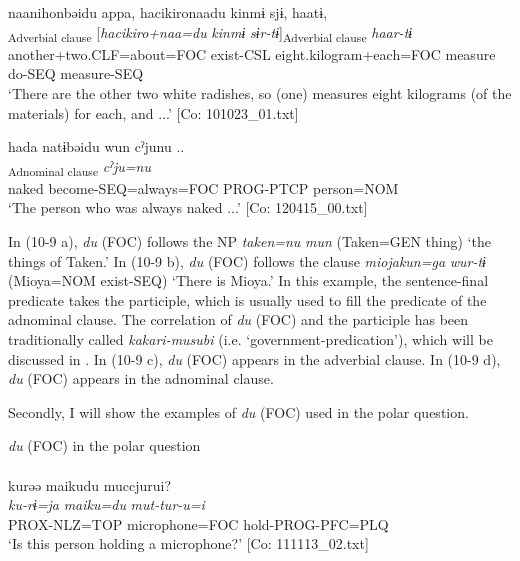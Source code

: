   \ex  %
      \glll    naa{\textbar}nihon{\textbar}bəidu  appa,  {\textbar}hacikiro{\textbar}naadu   kinmɨ  sjɨ,  haatɨ,\\
      [\textit{naa+nihon=bəi=du}  \textit{ar-ba}]\textsubscript{Adverbial clause}  [\textit{hacikiro+naa=du} \textit{kinmɨ}  \textit{sɨr-tɨ}]\textsubscript{Adverbial clause}  \textit{haar-tɨ}\\
      another+two.CLF=about=FOC  exist-CSL  eight.kilogram+each=FOC      measure  do-SEQ  measure-SEQ\\
      \glt       ‘There are the other two white radishes, so (one) measures eight kilograms (of the materials) for each, and ...’ [Co: 101023\_01.txt]

  \ex  %
      \glll    hada  natɨbəidu  wun  cˀjunu ..\\
      [\textit{hada}  \textit{nar-tɨ=bəi=du}  \textit{wur-n}]\textsubscript{Adnominal clause}  \textit{cˀju=nu}\\
      naked  become-SEQ=always=FOC  PROG-PTCP  person=NOM\\
      \glt       ‘The person who was always naked ...’ [Co: 120415\_00.txt]
    \z
\z

In (10-9 a), \textit{du} (FOC) follows the NP \textit{taken=nu} \textit{mun} (Taken=GEN thing) ‘the things of Taken.’ In (10-9 b), \textit{du} (FOC) follows the clause \textit{miojakun=ga} \textit{wur-tɨ} (Mioya=NOM exist-SEQ) ‘There is Mioya.’ In this example, the sentence-final predicate takes the participle, which is usually used to fill the predicate of the adnominal clause. The correlation of \textit{du} (FOC) and the participle has been traditionally called \textit{kakari-musubi} (i.e. ‘government-predication’), which will be discussed in . In (10-9 c), \textit{du} (FOC) appears in the adverbial clause. In (10-9 d), \textit{du} (FOC) appears in the adnominal clause.

  Secondly, I will show the examples of \textit{du} (FOC) used in the polar question.

\ea\label{ex:10.10}   \textit{du} (FOC) in the polar question\\
  \ea\relax  [= (8-76 d)]\\
      \glll    kurəə  {\textbar}maiku{\textbar}du  muccjurui?\\
      \textit{ku-rɨ=ja}  \textit{maiku=du}  \textit{mut-tur-u=i}\\
      PROX-NLZ=TOP  microphone=FOC  hold-PROG-PFC=PLQ\\
      \glt       ‘Is this person holding a microphone?’ [Co: 111113\_02.txt]

